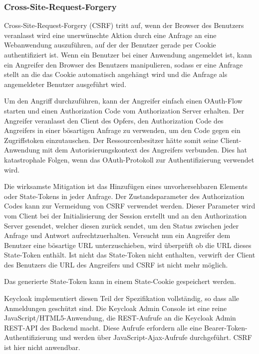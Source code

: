 \subsubsection{Cross-Site-Request-Forgery}


Cross-Site-Request-Forgery (CSRF) tritt auf, wenn der Browser des Benutzers veranlasst wird eine unerwünschte Aktion durch eine Anfrage an eine Webanwendung auszuführen, auf der der Benutzer gerade per Cookie authentifiziert ist. Wenn ein Benutzer bei einer Anwendung angemeldet ist, kann ein Angreifer den Browser des Benutzers manipulieren, sodass er eine Anfrage stellt an die das Cookie automatisch angehängt wird und die Anfrage als angemeldeter Benutzer ausgeführt wird. 

Um den Angriff durchzuführen, kann der Angreifer einfach einen OAuth-Flow starten und einen Authorization Code vom Authorization Server erhalten. Der Angreifer veranlasst den Client des Opfers, den Authorization Code des Angreifers in einer bösartigen Anfrage zu verwenden, um den Code gegen ein Zugriffstoken einzutauschen. Der Ressourcenbesitzer hätte somit seine Client-Anwendung mit dem Autorisierungskontext des Angreifers verbunden. Dies hat katastrophale Folgen, wenn das OAuth-Protokoll zur Authentifizierung verwendet wird. \cite{OAuth2inAction}

Die wirksamste Mitigation ist das Hinzufügen eines unvorhersehbaren Elements oder State-Tokens in jeder Anfrage. Der Zustandsparameter des Authorization Codes kann zur Vermeidung von CSRF verwendet werden. Dieser Parameter wird vom Client bei der Initialisierung der Session erstellt und an den Authorization Server gesendet, welcher diesen zurück sendet, um den Status zwischen jeder Anfrage und Antwort aufrechtzuerhalten. Versucht nun ein Angreifer dem Benutzer eine bösartige URL unterzuschieben, wird überprüft ob die URL dieses State-Token enthält. Ist nicht das State-Token nicht enthalten, verwirft der Client des Benutzers die URL des Angreifers und CSRF ist nicht mehr möglich. \cite{OAuth2inAction}

Das generierte State-Token kann in einem State-Cookie gespeichert werden.

Keycloak implementiert diesen Teil der Spezifikation vollständig, so dass alle Anmeldungen geschützt sind. Die Keycloak Admin Console ist eine reine JavaScript/HTML5-Anwendung, die REST-Aufrufe an die Keycloak Admin REST-API des Backend macht. Diese Aufrufe erfordern alle eine Bearer-Token-Authentifizierung und werden über JavaScript-Ajax-Aufrufe durchgeführt. CSRF ist hier nicht anwendbar. \cite{keycloakDocs}

